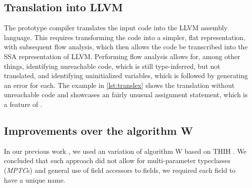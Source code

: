 \subsection{Translation into LLVM}

The prototype compiler translates the input code into the LLVM assembly language. This requires transforming the code into a simpler, flat representation, with subsequent flow analysis, which then allows the code be transcribed into the SSA representation of LLVM. Performing flow analysis allows for, among other things, identifying unreachable code, which is still type-inferred, but not translated, and identifying uninitialized variables, which is followed by generating an error for each. The example in \cref{lst:translex} shows the translation without unreachable code and showcases an fairly unusual assignment statement, which is a feature of \cmm.

\subsection{Improvements over the algorithm W}

In our previous work \cite{klepl2020type}, we used an variation of algorithm W based on THIH \cite{jones1999typing}. We concluded that such approach did not allow for multi-parameter typeclasses (\emph{MPTC}s) and general use of field accessors to  fields, we required each field to have a unique name.

